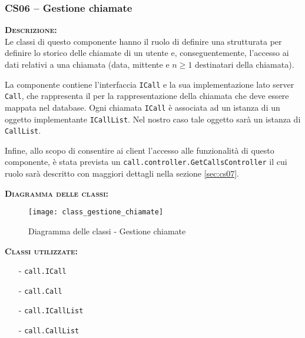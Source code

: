 
\subsubsection{CS06 -- Gestione chiamate}\label{sec:cs06}
\begin{description}
  \item{\scshape\bfseries Descrizione:}\\
Le classi di questo componente hanno il ruolo di definire una strutturata per definire lo storico delle chiamate di un utente e, conseguentemente, l'accesso ai dati relativi a una chiamata (data, mittente e $n\geq1$ destinatari della chiamata).

La componente contiene l'interfaccia \texttt{ICall} e la sua implementazione lato server \texttt{Call}, che rappresenta il  per la rappresentazione della chiamata che deve essere mappata nel database. Ogni chiamata \texttt{ICall} è associata ad un istanza di un oggetto implementante \texttt{ICallList}. Nel nostro caso tale oggetto sarà un istanza di \texttt{CallList}.

Infine, allo scopo di consentire ai client l'accesso alle funzionalità di questo componente, è stata prevista un  \texttt{call.controller.GetCallsController} il cui ruolo sarà descritto con maggiori dettagli nella sezione \vref{sec:cs07}.

  \item{\scshape\bfseries Diagramma delle classi:}
\begin{figure}[H]
  \centering
  \texttt{[image: class\_gestione\_chiamate]}
  \caption{Diagramma delle classi - Gestione chiamate}\label{fig:gestionechiamate}
\end{figure}

  \item{\scshape\bfseries Classi utilizzate:}\\
  \begin{itemize}[noitemsep,nolistsep]
    \item[-] \texttt{call.ICall}
    \item[-] \texttt{call.Call}
    \item[-] \texttt{call.ICallList}
    \item[-] \texttt{call.CallList}
  \end{itemize}
\end{description}

